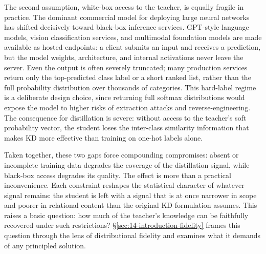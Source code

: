 \begin{foldable}
  The second assumption, white-box access to the teacher, is equally fragile in practice.
  The dominant commercial model for deploying large neural networks has shifted decisively toward black-box inference services.
  GPT-style language models, vision classification services, and multimodal foundation models are made available as hosted endpoints: a client submits an input and receives a prediction, but the model weights, architecture, and internal activations never leave the server.
  Even the output is often severely truncated; many production services return only the top-predicted class label or a short ranked list, rather than the full probability distribution over thousands of categories.
  This hard-label regime is a deliberate design choice, since returning full softmax distributions would expose the model to higher risks of extraction attacks and reverse-engineering.
  The consequence for distillation is severe: without access to the teacher's soft probability vector, the student loses the inter-class similarity information that makes \ac{KD} more effective than training on one-hot labels alone.
\end{foldable}

\begin{foldable}
  Taken together, these two gaps force compounding compromises: absent or incomplete training data degrades the coverage of the distillation signal, while black-box access degrades its quality.
  The effect is more than a practical inconvenience.
  Each constraint reshapes the statistical character of whatever signal remains: the student is left with a signal that is at once narrower in scope and poorer in relational content than the original \ac{KD} formulation assumes.
  This raises a basic question: how much of the teacher's knowledge can be faithfully recovered under such restrictions?
  \S\ref{sec:14-introduction-fidelity} frames this question through the lens of distributional fidelity and examines what it demands of any principled solution.
\end{foldable}
